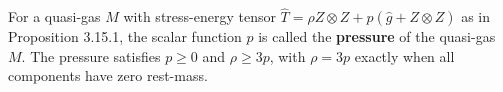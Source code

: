For a quasi-gas $M$ with stress-energy tensor $\hat{T} = \rho Z \otimes Z + p(\hat{g} + Z \otimes Z)$ as in Proposition 3.15.1, the scalar function $p$ is called the \textbf{pressure} of the quasi-gas $M$. The pressure satisfies $p \geq 0$ and $\rho \geq 3p$, with $\rho = 3p$ exactly when all components have zero rest-mass.
